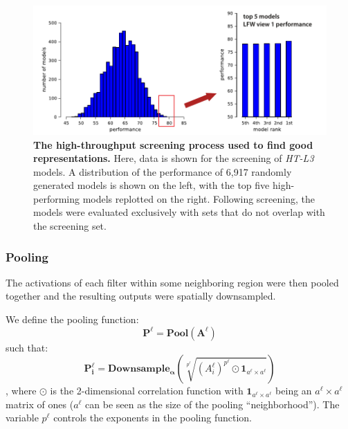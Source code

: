 \begin{figure}[ht]
\begin{center}
	\includegraphics[scale=1]{figures/ht_process_l3.pdf}

    \caption[]{{\bf The high-throughput screening process used to find good representations.}  Here, data is shown for the screening of
      \emph{HT-L3} models.  A distribution of the performance of 6,917 randomly
      generated models is shown on the left, with the top five high-performing
      models replotted on the right.  Following screening, the models were evaluated
      exclusively with sets that do not overlap with the screening set.}

    \label{fig:ht_process}
 \end{center}
\end{figure}


\subsubsection{Pooling}

The activations of each filter within some neighboring region were then pooled
together and the resulting outputs were spatially downsampled.

We define the pooling function:
\begin{equation}
\mathbf{P^{\ell} = Pool(A^{\ell})}
\end{equation}
such that: \\
\begin{equation}\label{eq:pool}
\mathbf{P^{\ell}_{i}} = \mathbf{Downsample_{\alpha}}(
        \sqrt[p^{\ell}]{(A^{\ell}_i)^{p^{\ell}} \odot \mathbf{1}_{a^{\ell}
            \times a^{\ell}}} )
\end{equation}
, where $\odot$ is the 2-dimensional correlation function with
$\mathbf{1}_{a^{\ell} \times a^{\ell}}$ being an $a^{\ell} \times a^{\ell}$
matrix of ones ($a^{\ell}$ can be seen as the size of the pooling
``neighborhood'').  The variable $p^{\ell}$ controls the exponents in the
pooling function.

